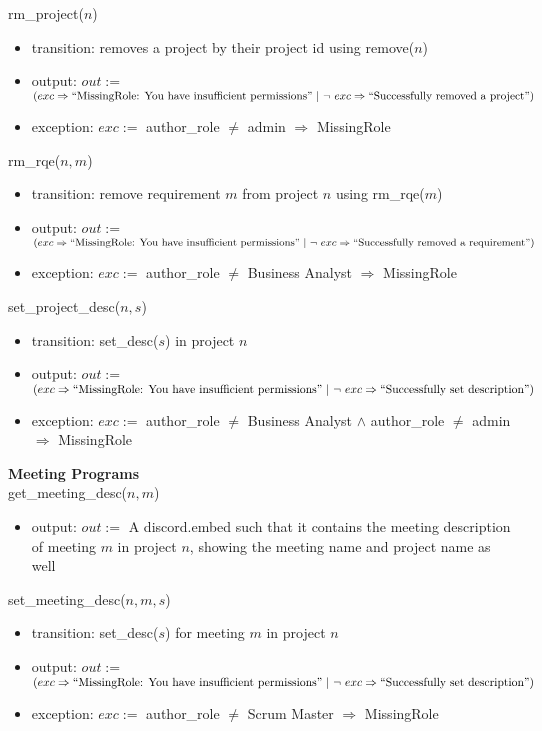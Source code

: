 \documentclass[12pt, titlepage]{article}
\begin{document}
\noindent rm\_project($n$)
\begin{itemize}
    \item transition: removes a project by their project id using remove($n$)
    \item output: $out :=$ $(exc \Rightarrow ``\text{MissingRole: You have insufficient permissions}"\ |\ \lnot\ exc \Rightarrow ``\text{Successfully removed a project}")$
    \item exception: $exc :=$ author\_role $\neq$ admin $\Rightarrow$ MissingRole
\end{itemize}

\noindent rm\_rqe($n, m$)
\begin{itemize}
    \item transition: remove requirement $m$ from project $n$ using rm\_rqe($m$)
    \item output: $out :=$ $(exc \Rightarrow ``\text{MissingRole: You have insufficient permissions}"\ |\ \lnot\ exc \Rightarrow ``\text{Successfully removed a requirement}")$
    \item exception: $exc :=$ author\_role $\neq$ Business Analyst $\Rightarrow$ MissingRole
\end{itemize}

\noindent set\_project\_desc($n, s$)
\begin{itemize}
    \item transition: set\_desc($s$) in project $n$
    \item output: $out :=$ $(exc \Rightarrow ``\text{MissingRole: You have insufficient permissions}"\ |\ \lnot\ exc \Rightarrow ``\text{Successfully set description}")$
    \item exception: $exc :=$ author\_role $\neq$ Business Analyst $\land$ author\_role $\neq$ admin $\Rightarrow$ MissingRole
\end{itemize}

\noindent \textbf{Meeting Programs\\}
\noindent get\_meeting\_desc($n, m$)
\begin{itemize}
    \item output: $out :=$ A discord.embed such that it contains the meeting description of meeting $m$ in project $n$, showing the meeting name and project name as well
\end{itemize}

\noindent set\_meeting\_desc($n, m, s$)
\begin{itemize}
    \item transition: set\_desc($s$) for meeting $m$ in project $n$
    \item output: $out :=$ $(exc \Rightarrow ``\text{MissingRole: You have insufficient permissions}"\ |\ \lnot\ exc \Rightarrow ``\text{Successfully set description}")$
    \item exception: $exc :=$ author\_role $\neq$ Scrum Master $\Rightarrow$ MissingRole
\end{itemize}
\end{document}
